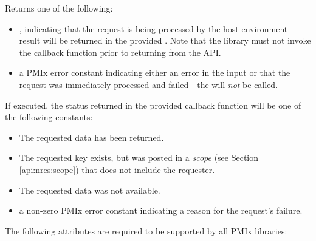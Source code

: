 \begin{arglist}
\end{arglist}

Returns one of the following:

\begin{itemize}
    \item {}, indicating that the request is being processed by the host environment - result will be returned in the provided . Note that the library must not invoke the callback function prior to returning from the \ac{API}.
    \item a \ac{PMIx} error constant indicating either an error in the input or that the request was immediately processed and failed - the  will \textit{not} be called.
\end{itemize}

If executed, the status returned in the provided callback function will be one of the following constants:

\begin{itemize}
\item {} The requested data has been returned.
\item {} The requested key exists, but was posted in a \emph{scope} (see Section \ref{api:nres:scope}) that does not include the requester.
\item {} The requested data was not available.
\item a non-zero \ac{PMIx} error constant indicating a reason for the request's failure.
\end{itemize}

\reqattrstart
The following attributes are required to be supported by all \ac{PMIx} libraries:


